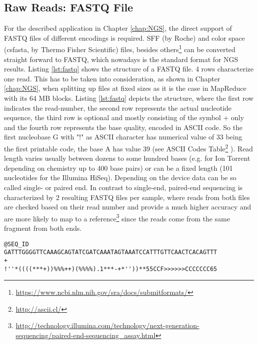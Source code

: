 \subsection{Raw Reads: FASTQ File}
For the described application in Chapter \ref{chap:NGS}, the  direct support of FASTQ files of different encodings is required. SFF (by Roche) and color space (csfasta, by Thermo Fisher Scientific) files, besides others\footnote{\url{https://www.ncbi.nlm.nih.gov/sra/docs/submitformats/}} can be converted straight forward to FASTQ, which nowadays is the standard format for NGS results.  
Listing \ref{lst:fastq} shows the structure of a FASTQ file. 4 rows characterize one read. This has to be taken into consideration, as shown in Chapter \ref{chap:NGS}, when splitting up files at fixed sizes as it is the case in MapReduce with its 64 MB blocks. Listing \ref{lst:fastq} depicts the structure, where the first row indicates the read-number, the second row represents the actual nucleotide sequence, the third row is optional and mostly consisting of the symbol {+} only and the fourth row represents the base quality, encoded in ASCII code. So the first nucleobase G with "!" as ASCII character has numerical value of 33 being the first printable code, the base A has value 39 (see  ASCII Codes Table\footnote{\url{http://ascii.cl/}} ). Read length varies usually between dozens to some hundred bases (e.g. for Ion Torrent depending on chemistry up to 400 base pairs) or can be a fixed length (101 nucleotides for the Illumina HiSeq). Depending on the device data can be so called single- or paired end. In contrast to single-end, paired-end sequencing is characterized by 2 resulting FASTQ files per sample, where reads from both files are checked based on their read number and provide a much higher accuracy and are more likely to map to a reference\footnote{\url{http://technology.illumina.com/technology/next-generation-sequencing/paired-end-sequencing_assay.html}} since the reads come from the same fragment from both ends.
\begin{lstlisting}[caption= {Excerpt of an FASTQ file, 4 rows representing one read}, label={lst:fastq}]
@SEQ_ID
GATTTGGGGTTCAAAGCAGTATCGATCAAATAGTAAATCCATTTGTTCAACTCACAGTTT
+
!''*((((***+))%%%++)(%%%%).1***-+*''))**55CCF>>>>>>CCCCCCC65
\end{lstlisting}
